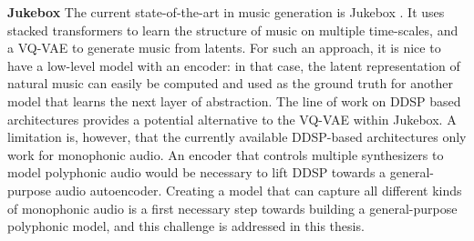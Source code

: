 \textbf{Jukebox} The current state-of-the-art in music generation is Jukebox \citep{jukebox}. It uses stacked transformers to learn the structure of music on multiple time-scales, and a VQ-VAE to generate music from latents.
For such an approach, it is nice to have a low-level model with an encoder: in that case, the latent representation of natural music can easily be computed and used as the ground truth for another model that learns the next layer of abstraction. \newline
The line of work on DDSP based architectures provides a potential alternative to the VQ-VAE within Jukebox.
A limitation is, however, that the currently available DDSP-based architectures only work for monophonic audio.
An encoder that controls multiple synthesizers to model polyphonic audio would be necessary to lift DDSP towards a general-purpose audio autoencoder.
Creating a model that can capture all different kinds of monophonic audio is a first necessary step towards building a general-purpose polyphonic model, and this challenge is addressed in this thesis. \newline
















